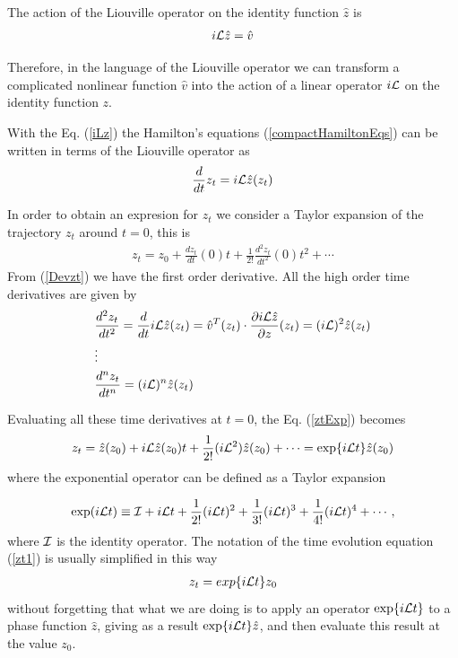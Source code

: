 \documentclass[a4paper,openright,12pt]{book}
\begin{document}
The action of the Liouville operator on the identity function $\hat{z}$ is
\begin{align}
  i{\cal L} \hat{z} = \hat{v}
  \label{iLz}
\end{align}

Therefore, in the language of the Liouville operator we can transform a complicated nonlinear function $\hat{v}$ into the action of a linear operator $i{\cal L}$ on the identity function $z$.

With the Eq. (\ref{iLz}) the Hamilton's equations (\ref{compactHamiltonEqs}) can be written in terms of the Liouville operator as
\begin{align}
  \frac{d}{dt}z_t=i{\cal L}\hat{z}(z_t)
  \label{Devzt}
\end{align}

In order to obtain an expresion for $z_t$ we consider a Taylor expansion of the trajectory $z_t$ around $t=0$, this is
\begin{align}
    z_t=z_0+\frac{dz_t}{dt}(0)t+\frac{1}{2!}\frac{d^2z_t}{dt^2}(0)t^2+\cdots
    \label{ztExp}
\end{align}
From (\ref{Devzt}) we have the first order derivative. All the high order time derivatives are given by
\begin{align}
    &\frac{d^2z_t}{dt^2} = \frac{d}{dt}i{\cal L}\hat{z}(z_t)
    =\hat{v}^T(z_t)\cdot\frac{\partial i{\cal L}\hat{z}}{\partial z}(z_t)
    =(i{\cal L})^2\hat{z}(z_t) \nonumber \\ 
    &\vdots \nonumber \\ 
    &\frac{d^n z_t}{dt^n} =(i{\cal L})^n\hat{z}(z_t)
\end{align}

Evaluating all these time derivatives at $t=0$, the Eq. (\ref{ztExp}) becomes
\begin{align}
    z_t=\hat{z}(z_0)+i{\cal L}\hat{z}(z_0)t
    +\frac{1}{2!}(i{\cal L}^2)\hat{z}(z_0)
    +\cdots
    ={\rm exp}\{i{\cal L}t\}\hat{z}(z_0)
    \label{zt1}
\end{align}
where the exponential operator can be defined as a Taylor expansion

\begin{align}
  {\rm exp}(i{\cal L}t) \equiv {\cal I} + i{\cal L}t + \frac{1}{2!}(i{\cal L}t)^2 + \frac{1}{3!}(i{\cal L}t)^3 +  \frac{1}{4!}(i{\cal L}t)^4 + \cdots,
\end{align}
where ${\cal I}$ is the identity operator.
The notation of the time evolution equation (\ref{zt1}) is usually simplified in this way 
\begin{align}
  z_t = exp\{i{\cal L}t\}z_0
  \label{zt}
\end{align}
without forgetting that what we are doing is to apply an operator ${\rm exp}\{i{\cal L}t\}$ to a phase function $\hat{z}$, giving as a result ${\rm exp}\{i{\cal L}t\}\hat{z}$, and then evaluate this result at the value $z_0$.
\end{document}

